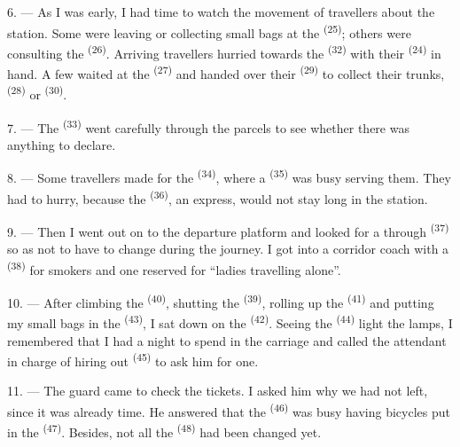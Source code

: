 6. --- As I was early, I had time to watch the movement of travellers about the station. Some
were leaving or collecting small bags at the
 \textsuperscript{(25)}; others were consulting the
 \textsuperscript{(26)}. Arriving travellers hurried towards the
 \textsuperscript{(32)} with their  \textsuperscript{(24)} in
hand. A few waited at the  \textsuperscript{(27)} and handed over
their  \textsuperscript{(29)} to collect their trunks,
 \textsuperscript{(28)} or  \textsuperscript{(30)}.

7. --- The  \textsuperscript{(33)} went carefully through the parcels
to see whether there was anything to declare.

8. --- Some travellers made for the  \textsuperscript{(34)}, where a
 \textsuperscript{(35)} was busy serving them. They had to hurry, because the
 \textsuperscript{(36)}, an express, would not stay long in the station.

9. --- Then I went out on to the departure platform and looked for a through 
\textsuperscript{(37)} so as not to have to change during the journey. I got into a corridor
coach with a  \textsuperscript{(38)} for smokers and one reserved for
“ladies travelling alone”.

\VUsaut{3.0mm}

10. --- After climbing the  \textsuperscript{(40)}, shutting the
 \textsuperscript{(39)}, rolling up the  \textsuperscript{(41)} and
putting my small bags in the  \textsuperscript{(43)}, I sat down on the
 \textsuperscript{(42)}. Seeing the  \textsuperscript{(44)}
light the lamps, I remembered that I had a night to spend in the carriage and called the
attendant in charge of hiring out  \textsuperscript{(45)} to ask him for one.

11. --- The guard came to check the tickets. I asked him why we had not left, since it was
already time. He answered that the
 \textsuperscript{(46)} was busy having bicycles put in the
 \textsuperscript{(47)}. Besides, not all the 
\textsuperscript{(48)} had been changed yet.

